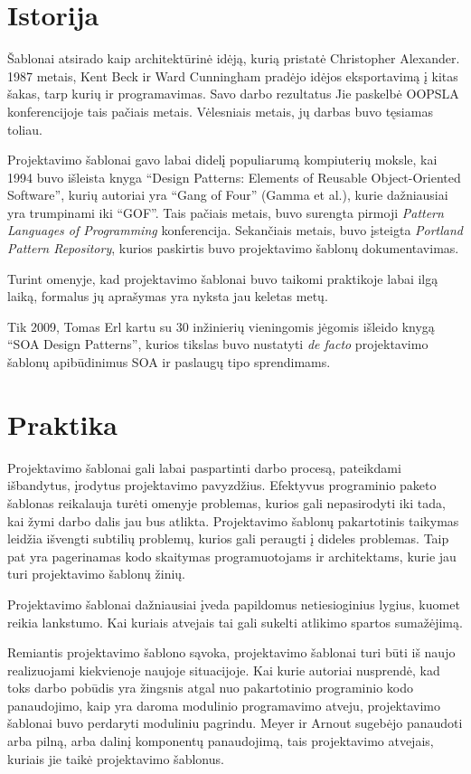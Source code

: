 \documentclass[10pt]{IEEEtran}
\begin{document}
	\section{Istorija}

		Šablonai atsirado kaip architektūrinė idėją, kurią pristatė Christopher Alexander. 1987 metais, Kent Beck ir Ward Cunningham pradėjo idėjos eksportavimą į kitas šakas, tarp kurių ir programavimas. Savo darbo rezultatus Jie paskelbė OOPSLA konferencijoje tais pačiais metais. Vėlesniais metais, jų darbas buvo tęsiamas toliau.

		Projektavimo šablonai gavo labai didelį populiarumą kompiuterių moksle, kai 1994 buvo išleista knyga ``Design Patterns: Elements of Reusable Object-Oriented Software'', kurių autoriai yra ``Gang of Four'' (Gamma et al.), kurie dažniausiai yra trumpinami iki ``GOF''. Tais pačiais metais, buvo surengta pirmoji \textit{Pattern Languages of Programming} konferencija. Sekančiais metais, buvo įsteigta \textit{Portland Pattern Repository}, kurios paskirtis buvo projektavimo šablonų dokumentavimas. 

		Turint omenyje, kad projektavimo šablonai buvo taikomi praktikoje labai ilgą laiką, formalus jų aprašymas yra nyksta jau keletas metų.

		Tik 2009, Tomas Erl kartu su 30 inžinierių vieningomis jėgomis išleido knygą ``SOA Design Patterns'', kurios tikslas buvo nustatyti \textit{de facto} projektavimo šablonų apibūdinimus SOA ir paslaugų tipo sprendimams.

	\section{Praktika}

		Projektavimo šablonai gali labai paspartinti darbo procesą, pateikdami išbandytus, įrodytus projektavimo pavyzdžius. Efektyvus programinio paketo šablonas reikalauja turėti omenyje problemas, kurios gali nepasirodyti iki tada, kai žymi darbo dalis jau bus atlikta. Projektavimo šablonų pakartotinis taikymas leidžia išvengti subtilių problemų, kurios gali peraugti į dideles problemas. Taip pat yra pagerinamas kodo skaitymas programuotojams ir architektams, kurie jau turi projektavimo šablonų žinių.

		Projektavimo šablonai dažniausiai įveda papildomus netiesioginius lygius, kuomet reikia lankstumo. Kai kuriais atvejais tai gali sukelti atlikimo spartos sumažėjimą.

		Remiantis projektavimo šablono sąvoka, projektavimo šablonai turi būti iš naujo realizuojami kiekvienoje naujoje situacijoje. Kai kurie autoriai nusprendė, kad toks darbo pobūdis yra žingsnis atgal nuo pakartotinio programinio kodo panaudojimo, kaip yra daroma modulinio programavimo atveju, projektavimo šablonai buvo perdaryti moduliniu pagrindu. Meyer ir Arnout sugebėjo panaudoti arba pilną, arba dalinį komponentų panaudojimą, tais projektavimo atvejais, kuriais jie taikė projektavimo šablonus.
\end{document}
